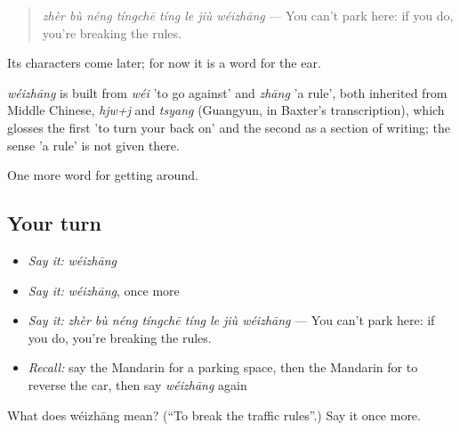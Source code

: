 \begin{quote}
\emph{zhèr bù néng tíngchē tíng le jiù wéizhāng} — You can't park here: if you do, you're breaking the rules.
\end{quote}

Its characters come later; for now it is a word for the ear.

\begin{cousinweb}
\emph{wéizhāng} is built from \emph{wéi} 'to go against' and \emph{zhāng} 'a rule', both inherited from Middle Chinese, \emph{hjw+j} and \emph{tsyang} (Guangyun, in Baxter's transcription), which glosses the first 'to turn your back on' and the second as a section of writing; the sense 'a rule' is not given there.
\end{cousinweb}

\begin{grammarlens}[title={What you've built}]
One more word for getting around.
\end{grammarlens}

\subsection*{Your turn}
\begin{itemize}
\raggedright
  \item \emph{Say it:} \emph{wéizhāng}
  \item \emph{Say it:} \emph{wéizhāng}, once more
  \item \emph{Say it:} \emph{zhèr bù néng tíngchē tíng le jiù wéizhāng} — You can't park here: if you do, you're breaking the rules.
  \item \emph{Recall:} say the Mandarin for a parking space, then the Mandarin for to reverse the car, then say \emph{wéizhāng} again
\end{itemize}

\begin{tcolorbox}[breakable,colback=teal!4,colframe=teal!35!black,title={Before you move on}]
What does wéizhāng mean? (\textquotedblleft{}To break the traffic rules\textquotedblright{}.) Say it once more.
\end{tcolorbox}
